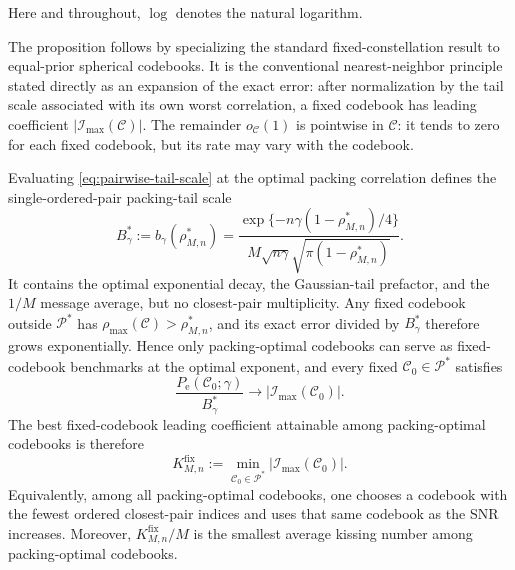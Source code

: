 \documentclass[12pt,draftclsnofoot,onecolumn]{IEEEtran}
\newcommand{\cC}{\mathcal{C}}
\newcommand{\cI}{\mathcal{I}}
\newcommand{\cP}{\mathcal{P}}
\newcommand{\Pe}{P_{\mathrm e}}
\theoremstyle{definition}
\begin{document}
Here and throughout, \(\log\) denotes the natural logarithm.

The proposition follows by specializing the standard fixed-constellation
result \cite[Th.~3]{AlvaradoAgrellBrannstrom2018} to equal-prior
spherical codebooks.
It is the conventional nearest-neighbor principle stated directly as an
expansion of the exact error: after normalization by the tail scale
associated with its own worst correlation, a fixed codebook has leading
coefficient \(|\cI_{\max}(\cC)|\).
The remainder \(o_{\cC}(1)\) is pointwise in \(\cC\): it tends to zero
for each fixed codebook, but its rate may vary with the codebook.
 

Evaluating \eqref{eq:pairwise-tail-scale} at the optimal packing
correlation defines the single-ordered-pair packing-tail scale
\begin{equation}
  B_\gamma^{\ast}
  :=b_\gamma(\rho^{\ast}_{M,n})
  =\frac{\exp\{-n\gamma(1-\rho^{\ast}_{M,n})/4\}}
  {M\sqrt{n\gamma}\sqrt{\pi(1-\rho^{\ast}_{M,n})}}.
  \label{eq:Bstar}
\end{equation}
It contains the optimal exponential decay, the Gaussian-tail prefactor,
and the \(1/M\) message average, but no closest-pair multiplicity.  Any fixed
codebook outside \(\cP^{\ast}\) has
\(\rho_{\max}(\cC)>\rho^{\ast}_{M,n}\), and its exact error divided by
\(B_\gamma^{\ast}\) therefore grows exponentially.  Hence only
packing-optimal codebooks can serve as fixed-codebook benchmarks at the
optimal exponent, and every fixed \(\cC_0\in\cP^{\ast}\) satisfies
\begin{equation}
  \frac{\Pe(\cC_0;\gamma)}{B_\gamma^{\ast}}
  \longrightarrow|\cI_{\max}(\cC_0)|.
  \label{eq:fixed-packing-normalized-limit}
\end{equation}
The best fixed-codebook leading coefficient attainable among
packing-optimal codebooks is therefore
\begin{equation}
  K^{\mathrm{fix}}_{M,n}
  :=\min_{\cC_0\in\cP^{\ast}}|\cI_{\max}(\cC_0)|.
  \label{eq:fixed-packing-coefficient}
\end{equation}
Equivalently, among all packing-optimal codebooks, one chooses a
codebook with the fewest ordered closest-pair indices and uses that same
codebook as the SNR increases.  Moreover,
\(K^{\mathrm{fix}}_{M,n}/M\) is the
smallest average kissing number among packing-optimal codebooks.
\end{document}
